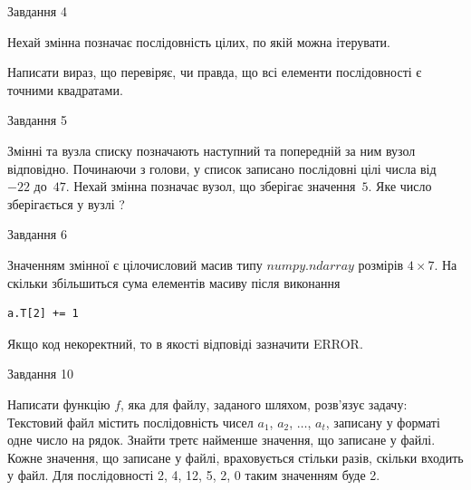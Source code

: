 \documentclass[12pt, ukrainian]{article}
\begin{document}
{\begin{minipage}[t]{8.0cm}
\end{minipage}


               
{\begin{center}Завдання {4}\end{center}}
\vspace{-4mm}
Нехай змінна  позначає послідовність цілих, по якій можна ітерувати.

Написати вираз, що перевіряє, чи правда, що всі елементи послідовності є точними квадратами.\par

\vspace{10mm}
               
{\begin{center}Завдання {5}\end{center}}
\vspace{-4mm}
Змінні  та  вузла списку позначають наступний та попередній за ним вузол відповідно. Починаючи з голови, у список записано послідовні цілі числа від~$-22$ до~$47$. Нехай змінна  позначає вузол, що зберігає значення~$5$.
Яке число зберігається у вузлі  ?\par

               
{\begin{center}Завдання {6}\end{center}}
\vspace{-4mm}
Значенням змінної  є цілочисловий масив типу $numpy.ndarray$ розмірів $4{\times}7$. На скільки збільшиться сума елементів масиву  після виконання
\begin{verbatim}
a.T[2] += 1
\end{verbatim}


Якщо код некоректний, то в якості відповіді зазначити ERROR.\par

               
{\begin{center}Завдання {10}\end{center}}
\vspace{-4mm}

Написати функцію $f$, яка для файлу, заданого шляхом, розв’язує задачу:\\ Текстовий файл містить послідовність чисел $a_1$, $a_2$, $\ldots$, $a_t$, записану у форматі одне число на рядок. Знайти третє найменше значення, що записане у файлі. Кожне значення, що записане у файлі, враховується стільки разів, скільки входить у файл. Для послідовності 2, 4, 12, 5, 2, 0 таким значенням буде 2.

}
\end{document}
